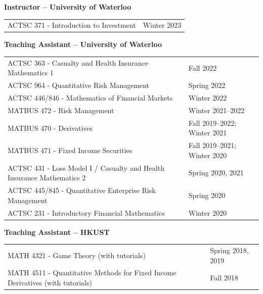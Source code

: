 \documentclass[10pt]{article}
\begin{document}
{\bf Instructor -- University of Waterloo}

\begin{center}
\renewcommand{\arraystretch}{1.5}%
\begin{tabular}{>{\raggedright}m{13cm}>{\raggedleft\arraybackslash} m{3.5cm}}
ACTSC 371 - Introduction to Investment & Winter 2023\\
\end{tabular}
\end{center}

{\bf Teaching Assistant -- University of Waterloo}

\begin{center}
\renewcommand{\arraystretch}{1.5}%
\begin{tabular}{>{\raggedright}m{13cm}>{\raggedleft\arraybackslash} m{3.5cm}}
ACTSC 363 - Casualty and Health Insurance Mathematics 1 & Fall 2022\\
ACTSC 964 - Quantitative Risk Management & Spring 2022\\
ACTSC 446/846 - Mathematics of Financial Markets & Winter 2022\\
MATBUS 472 - Risk Management & Winter 2021--2022\\
MATBUS 470 - Derivatives & Fall 2019--2022; Winter 2021\\
MATBUS 471 - Fixed Income Securities & Fall 2019--2021; Winter 2020\\
ACTSC 431 - Loss Model I / Casualty and Health Insurance Mathematics 2 & Spring 2020, 2021\\
ACTSC 445/845 - Quantitative Enterprise Risk Management & Spring 2020\\
ACTSC 231 - Introductory Financial Mathematics & Winter 2020\\
\end{tabular}
\end{center}

{\bf Teaching Assistant -- HKUST}

\begin{center}
\renewcommand{\arraystretch}{1.5}%
\begin{tabular}{>{\raggedright}m{13cm}>{\raggedleft\arraybackslash} m{3.5cm}}
MATH 4321 - Game Theory (with tutorials) & Spring 2018, 2019\\
MATH 4511 - Quantitative Methods for Fixed Income Derivatives (with tutorials) & Fall 2018\\
\end{tabular}
\end{center}
\end{document}
